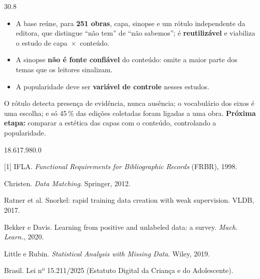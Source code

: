 \begin{coluna}{30.8}
  \begin{itemize}
    \item A base reúne, para \textbf{251 obras}, capa, sinopse e um rótulo independente da
      editora, que distingue \enquote{não tem} de \enquote{não sabemos}; é
      \textbf{reutilizável} e viabiliza o estudo de capa~$\times$~conteúdo.
    \item A sinopse \textbf{não é fonte confiável} do conteúdo: omite a maior parte dos
      temas que os leitores sinalizam.
    \item A popularidade deve ser \textbf{variável de controle} nesses estudos.
  \end{itemize}
\proxima

  O rótulo detecta presença de evidência, nunca ausência; o vocabulário dos eixos é uma
  escolha; e só 45\,\% das edições coletadas foram ligadas a uma obra. \textbf{Próxima
  etapa:} comparar a estética das capas com o conteúdo, controlando a popularidade.\par
\end{coluna}

\begin{bloco}{18.6}{17.9}{80.0}
  {\fontsize{15}{18}\selectfont\color{cinzaescuro}
  [1] IFLA. \emph{Functional Requirements for Bibliographic Records} (FRBR), 1998.\par
  [2] Christen. \emph{Data Matching}. Springer, 2012.\par
  [3] Ratner et al. Snorkel: rapid training data creation with weak supervision. VLDB, 2017.\par
  [4] Bekker e Davis. Learning from positive and unlabeled data: a survey. \emph{Mach. Learn.}, 2020.\par
  [5] Little e Rubin. \emph{Statistical Analysis with Missing Data}. Wiley, 2019.\par
  [6] Brasil. Lei nº 15.211/2025 (Estatuto Digital da Criança e do Adolescente).\par}
\end{bloco}


